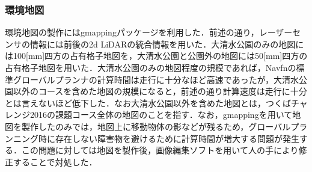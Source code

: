 \documentclass[10pt,a4paper]{jarticle}
\begin{document}
\subsubsection{環境地図}
環境地図の製作にはgmappingパッケージを利用した．前述の通り，レーザーセンサの情報には前後の2d LiDARの統合情報を用いた．大清水公園のみの地図には100[mm]四方の占有格子地図を，大清水公園と公園外の地図には50[mm]四方の占有格子地図を用いた．大清水公園のみの地図程度の規模であれば，Navfnの標準グローバルプランナの計算時間は走行に十分なほど高速であったが，大清水公園以外のコースを含めた地図の規模になると，前述の通り計算速度は走行に十分とは言えないほど低下した．なお大清水公園以外を含めた地図とは，つくばチャレンジ2016の課題コース全体の地図のことを指す．なお，gmappingを用いて地図を製作したのみでは，地図上に移動物体の影などが残るため，グローバルプランニング時に存在しない障害物を避けるために計算時間が増大する問題が発生する．この問題に対しては地図を製作後，画像編集ソフトを用いて人の手により修正することで対処した．
\end{document}
